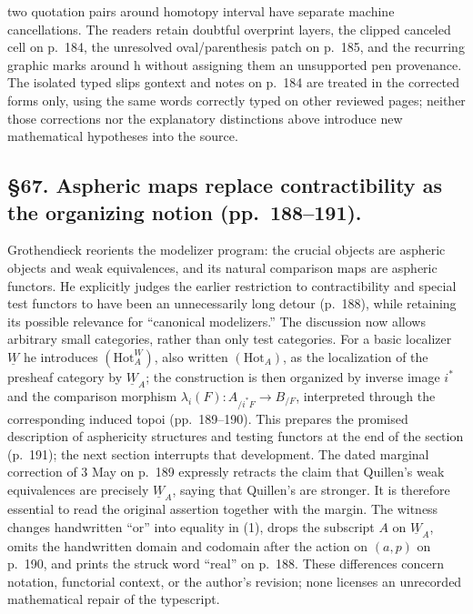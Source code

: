 \documentclass[10pt,oneside]{book}
\begin{document}
two quotation pairs around homotopy interval have separate machine cancellations. The readers retain doubtful overprint layers, the clipped canceled cell on p.~184, the unresolved oval/parenthesis patch on p.~185, and the recurring graphic marks around h without assigning them an unsupported pen provenance. The isolated typed slips gontext and notes on p.~184 are treated in the corrected forms only, using the same words correctly typed on other reviewed pages; neither those corrections nor the explanatory distinctions above introduce new mathematical hypotheses into the source.

\subsection*{\S67. Aspheric maps replace contractibility as the organizing notion (pp.\ 188--191).}
Grothendieck reorients the modelizer program: the crucial objects are aspheric objects and weak equivalences, and its natural comparison maps are aspheric functors. He explicitly judges the earlier restriction to contractibility and special test functors to have been an unnecessarily long detour (p.\ 188), while retaining its possible relevance for ``canonical modelizers.'' The discussion now allows arbitrary small categories, rather than only test categories. For a basic localizer $\underline W$ he introduces $(\mathrm{Hot}^{W}_{A})$, also written $(\mathrm{Hot}_{A})$, as the localization of the presheaf category by $\underline W_A$; the construction is then organized by inverse image $i^*$ and the comparison morphism $\lambda_i(F):A_{/i^*F}\longrightarrow B_{/F}$, interpreted through the corresponding induced topoi (pp.\ 189--190). This prepares the promised description of asphericity structures and testing functors at the end of the section (p.\ 191); the next section interrupts that development. The dated marginal correction of 3 May on p.\ 189 expressly retracts the claim that Quillen's weak equivalences are precisely $\underline W_A$, saying that Quillen's are stronger. It is therefore essential to read the original assertion together with the margin. The witness changes handwritten ``or'' into equality in (1), drops the subscript $A$ on $\underline W_A$, omits the handwritten domain and codomain after the action on $(a,p)$ on p.\ 190, and prints the struck word ``real'' on p.\ 188. These differences concern notation, functorial context, or the author's revision; none licenses an unrecorded mathematical repair of the typescript.
\end{document}
